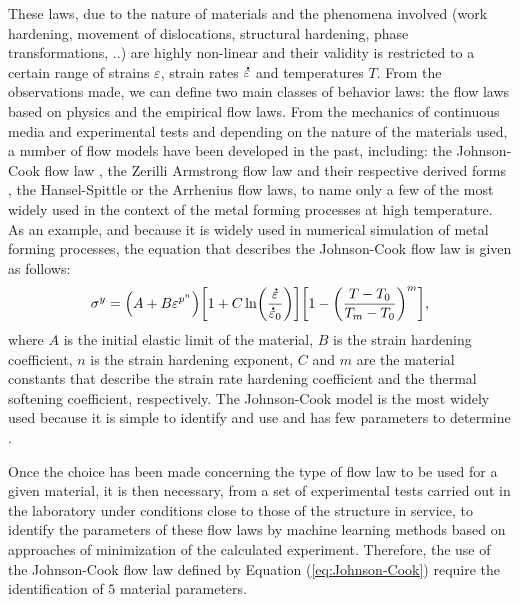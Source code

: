 \documentclass[algorithms,article,submit,pdftex,moreauthors]{Definitions/mdpi}
\DeclareRobustCommand{\mdot}[1]{\accentset{\mbox{\bfseries .}}{#1}}
\begin{document}
These laws, due to the nature of materials and the phenomena involved \cite{Lennon-2004, Zhang-2012} (work hardening, movement of dislocations, structural hardening, phase transformations, ..) are highly non-linear and their validity is restricted to a certain range of strains $\varepsilon$, strain rates $\mdot\varepsilon$ and temperatures $T$.
From the observations made, we can define two main classes of behavior laws: the flow laws based on physics and the empirical flow laws.
From the mechanics of continuous media and experimental tests and depending on the nature of the materials used, a number of flow models have been developed in the past, including: the Johnson-Cook flow law \cite{Johnson-1983, Johnson-1988}, the Zerilli Armstrong flow law \cite{Zerilli-1987} and their respective derived forms \cite{Lin-2011, Li-2013, Zhang-2015, Zhou-2020, Jia-2021, Rule-1998, Lin2010, Muralli-2017, Cheng-2021}, the Hansel-Spittle \cite{Hensel-1978, Chadha-2018} or the Arrhenius \cite{Jonas-1969, He-2013, Liang-2022} flow laws, to name only a few of the most widely used in the context of the metal forming processes at high temperature.
As an example, and because it is widely used in numerical simulation of metal forming processes, the equation that describes the Johnson-Cook flow law \cite{Johnson-1983} is given as follows:
\begin{equation}
\sigma^y=\left(A+B\varepsilon^{p^{n}}\right) \left[1+C\ln\left(\frac{\mdot\varepsilon}{\mdot\varepsilon_0}\right)\right] \left[1-\left(\frac{T-T_0}{T_m-T_0}\right)^{m}\right],\label{eq:Johnson-Cook}
\end{equation}
where $A$ is the initial elastic limit of the material, $B$ is the strain hardening coefficient, $n$ is the strain hardening exponent, $C$ and $m$ are the material constants that describe the strain rate hardening coefficient and the thermal softening coefficient, respectively.
The Johnson-Cook model is the most widely used because it is simple to identify and use and has few parameters to determine \cite{NematNasser-2003, Khan-2004}.

Once the choice has been made concerning the type of flow law to be used for a given material, it is then necessary, from a set of experimental tests carried out in the laboratory under conditions close to those of the structure in service, to identify the parameters of these flow laws by machine learning methods based on approaches of minimization of the calculated experiment.
Therefore, the use of the Johnson-Cook flow law defined by Equation (\ref{eq:Johnson-Cook}) require the identification of $5$ material parameters.
\end{document}
